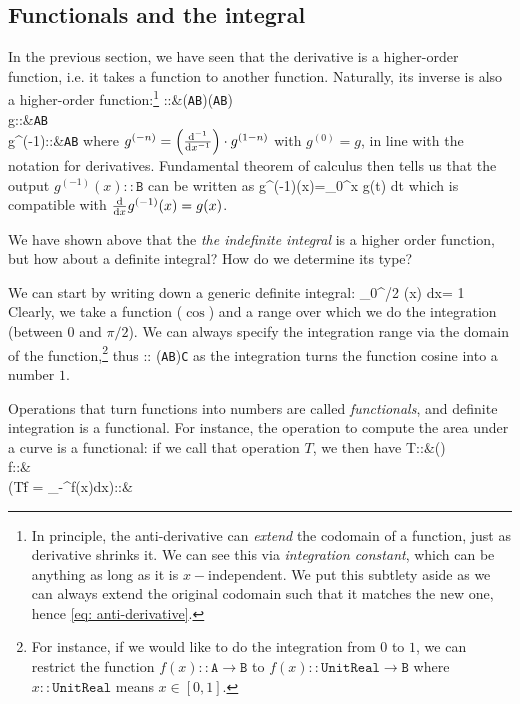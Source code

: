 \subsection{Functionals and the integral}
In the previous section, we have seen that the derivative is a higher-order function, i.e. it takes a function to another function. Naturally, its inverse is also a higher-order function:\footnote{In principle, the anti-derivative can \emph{extend} the codomain of a function, just as derivative shrinks it. We can see this via \emph{integration constant}, which can be anything as long as it is $x-$independent. We put this subtlety aside as we can always extend the original codomain such that it matches the new one, hence \eqref{eq: anti-derivative}.}
\bea 
{}::{}&\left(\texttt{A}\to\texttt{B}\right)\to\left(\texttt{A}\to\texttt{B}\right)\label{eq: anti-derivative}\\
g::{}&\texttt{A}\to\texttt{B}\\
g^{(-1)}::{}&\texttt{A}\to\texttt{B}
\eea  
where $g^{(-n)}=\left(\frac{\dd {}^{-1}}{\dd x^{-1}}\right)\cdot g^{(1-n)}$ with $g^{(0)}=g$, in line with the notation for derivatives. Fundamental theorem of calculus then tells us that the output \mbox{$g^{(-1)}(x)::\texttt{B}$} can be written as
\be 
g^{(-1)}(x)=\int\limits_0^x g(t) dt
\ee 
which is compatible with $\frac{\dd }{\dd x}g^{(-1)}(x)=g(x)$.

We have shown above that the \emph{the indefinite integral} is a higher order function, but how about a definite integral? How do we determine its type?

We can start by writing down a generic definite integral:
\be 
\int\limits_{0}^{\pi/2} \cos(x) dx= 1
\ee 
Clearly, we take a function ($\cos$) and a range over which we do the integration (between $0$ and $\pi/2$). We can always specify the integration range via the domain of the function,\footnote{
For instance, if we would like to do the integration from $0$ to $1$, we can restrict the function $f(x)::\texttt{A}\to\texttt{B}$ to $f(x)::\texttt{UnitReal}\to\texttt{B}$ where $x::\texttt{UnitReal}$ means $x\in[0,1]$.
} thus
\be 
\int\limits :: (\texttt{A}\to\texttt{B})\to\texttt{C}
\ee 
as the integration turns the function cosine into a number $1$.

Operations that turn functions into numbers are called \emph{functionals}, and definite integration is a functional.  For instance, the operation to compute the area under a curve is a functional: if we call that operation $T$, we then have
\bea 
T::{}&\left(\R\to\R\right)\to\R\\
f::{}&\R\to\R\\
\left(T\.f = \int\limits_{-\infty}^\infty f(x)dx\right)::{}&\R
\eea  

